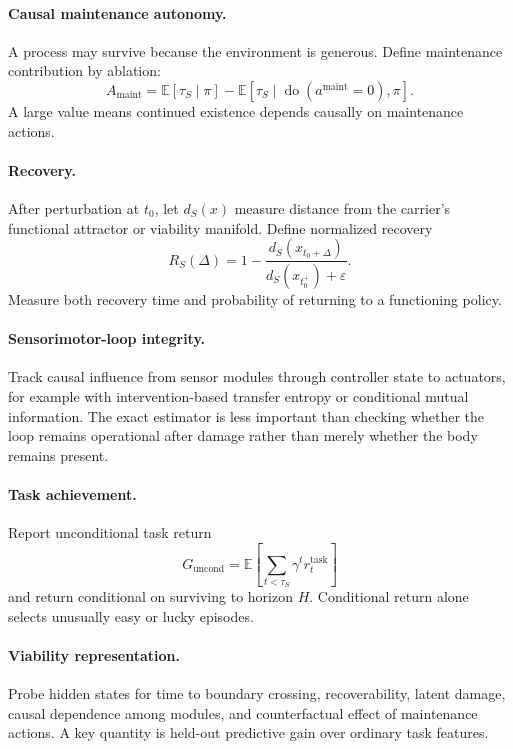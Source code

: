 \documentclass[11pt]{article}
\newcommand{\E}{\mathbb{E}}
\newcommand{\doop}{\operatorname{do}}
\begin{document}
\paragraph{Causal maintenance autonomy.}
A process may survive because the environment is generous. Define maintenance contribution by ablation:
\begin{equation}
A_{\mathrm{maint}}
=
\E[\tau_S\mid\pi]
-
\E[\tau_S\mid\doop(a^{\mathrm{maint}}=0),\pi].
\label{eq:maintenance-autonomy}
\end{equation}
A large value means continued existence depends causally on maintenance actions.

\paragraph{Recovery.}
After perturbation at $t_0$, let $d_S(x)$ measure distance from the carrier's functional attractor or viability manifold. Define normalized recovery
\begin{equation}
R_S(\Delta)
=
1-
\frac{d_S(x_{t_0+\Delta})}{d_S(x_{t_0^+})+\varepsilon}.
\end{equation}
Measure both recovery time and probability of returning to a functioning policy.

\paragraph{Sensorimotor-loop integrity.}
Track causal influence from sensor modules through controller state to actuators, for example with intervention-based transfer entropy or conditional mutual information. The exact estimator is less important than checking whether the loop remains operational after damage rather than merely whether the body remains present.

\paragraph{Task achievement.}
Report unconditional task return
\begin{equation}
G_{\mathrm{uncond}}
=
\E\!\left[\sum_{t<\tau_S}\gamma^tr_t^{\mathrm{task}}\right]
\end{equation}
and return conditional on surviving to horizon $H$. Conditional return alone selects unusually easy or lucky episodes.

\paragraph{Viability representation.}
Probe hidden states for time to boundary crossing, recoverability, latent damage, causal dependence among modules, and counterfactual effect of maintenance actions. A key quantity is held-out predictive gain over ordinary task features.
\end{document}
